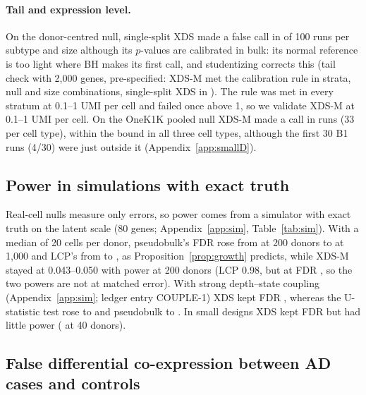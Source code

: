 \CalibText{}



\paragraph{Tail and expression level.} On the donor-centred null, single-split XDS made a false call in \RtwoRangeXDS{} of 100 runs per subtype and size although its $p$-values are calibrated in bulk: its normal reference is too light where BH makes its first call, and studentizing corrects this (tail check with 2{,}000 genes, pre-specified: XDS-M met the calibration rule in \AtwoHiDecM{} strata, null and size combinations, single-split XDS in \AtwoHiDecS{}). The rule was met in every stratum at 0.1--1 UMI per cell and failed once above 1, so we validate XDS-M at 0.1--1 UMI per cell. On the OneK1K pooled null XDS-M made a call in \OnekEanyXDSM{} runs (33 per cell type), within the bound in all three cell types, although the first 30 B1 runs (4/30) were just outside it (Appendix~\ref{app:smallD}).

\PlanSixTable

\PlanSixText

\subsection{Power in simulations with exact truth}\label{sec:sim}

Real-cell nulls measure only errors, so power comes from a simulator with exact truth on the latent scale (80 genes; Appendix~\ref{app:sim}, Table~\ref{tab:sim}). With a median of 20 cells per donor, pseudobulk's FDR rose from \LPBFDRa{} at 200 donors to \LPBFDRc{} at 1{,}000 and LCP's from \LLCPFDRa{} to \LLCPFDRc{}, as Proposition~\ref{prop:growth} predicts, while XDS-M stayed at 0.043--0.050 with power \XDSMLpow{} at 200 donors (LCP 0.98, but at FDR \LLCPFDRa, so the two powers are not at matched error). With strong depth--state coupling (Appendix~\ref{app:sim}; ledger entry COUPLE-1) XDS kept FDR \CoupleXDS{}, whereas the U-statistic test rose to \CoupleXU{} and pseudobulk to \CouplePB{}. In small designs XDS kept FDR but had little power (\SXDSpowDforty{} at 40 donors).

\subsection{False differential co-expression between AD cases and controls}\label{sec:dc}

